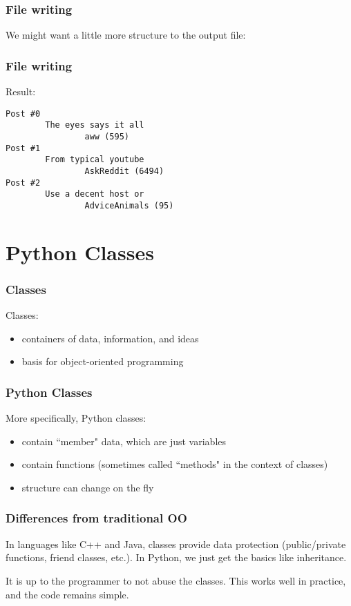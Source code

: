 \documentclass{beamer}
\begin{document}
\begin{frame}
\frametitle{File writing}
We might want a little more structure to the output file:
\end{frame}

\begin{frame}[fragile]
\frametitle{File writing}
Result:
\begin{verbatim}
Post #0
        The eyes says it all
                aww (595)
Post #1
        From typical youtube
                AskReddit (6494)
Post #2
        Use a decent host or
                AdviceAnimals (95)
\end{verbatim}
\end{frame}

\section{Python Classes}

\begin{frame}
\frametitle{Classes}

Classes:
\vspace{0.1in}
\begin{itemize}
\setlength{\itemsep}{0.1in}
\item{containers of data, information, and ideas}
\item{basis for object-oriented programming}
\end{itemize}

\end{frame}

\begin{frame}
\frametitle{Python Classes}

More specifically, Python classes:
\vspace{0.1in}
\begin{itemize}
\setlength{\itemsep}{0.1in}
\item{contain ``member" data, which are just variables}
\item{contain functions (sometimes called ``methods" in the context of classes)}
\item{structure can change on the fly}
\end{itemize}

\end{frame}

\begin{frame}
\frametitle{Differences from traditional OO}

In languages like C++ and Java, classes provide data protection (public/private functions, friend classes, etc.).  In Python, we just get the basics like inheritance.

\vspace{0.2in}

It is up to the programmer to not abuse the classes.  This works well in practice, and the code remains simple.
\end{frame}
\end{document}
